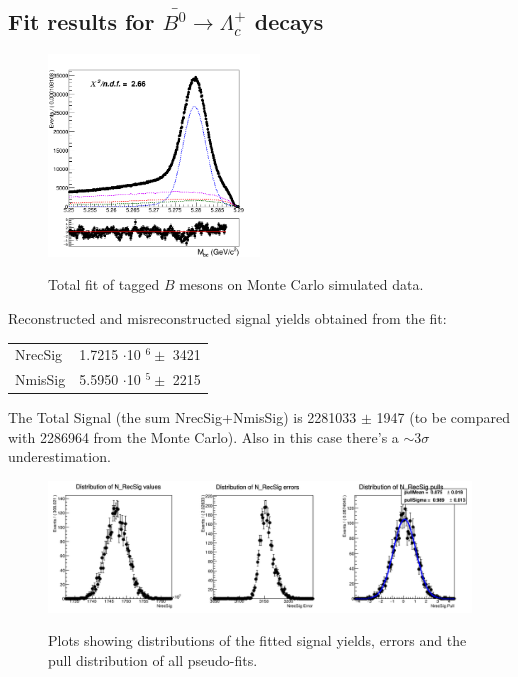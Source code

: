 \subsection{Fit results for $\bar{B^0} \rightarrow \Lambda_c^+$ decays} 

\begin{figure}[H]
    \centering
    {\includegraphics[width=0.50\textwidth]{05-BtagFit/figs/neutralCorrLambdaC_BtagFit.png}}
    \caption{Total fit of tagged $B$ mesons on Monte Carlo simulated data.}
    \label{fig:neutralCorrLambdaC_BtagFit}
    \end{figure}
    \vspace{1.5cm} 

Reconstructed and misreconstructed signal yields obtained from the fit:\\
    \vspace{0.25 cm}
    
    \begin{tabular}{ |p{2.5cm}||p{4.2cm}|  }
     \hline
     NrecSig  & 1.7215 $\cdot$10 $^6 \pm$ 3421\\
     NmisSig &  5.5950 $\cdot$10 $^5 \pm$ 2215 \\
     \hline
    \end{tabular}      
    
    \vspace{0.5 cm}
    \noindent The Total Signal (the sum  NrecSig+NmisSig) is 2281033 $\pm$ 1947 (to be compared with 2286964 from the Monte Carlo).
    Also in this case there's a $\sim 3\sigma$ underestimation. 
   
 \vspace{0.5 cm}
       
\begin{figure}[H]
\centering
{\centering\includegraphics[width=14cm]{05-BtagFit/figs/NrecSig_neutralCorrBtag_mcstudy.png}}
\caption{Plots showing distributions of the fitted signal yields, errors and the pull distribution of
all pseudo-fits. }
\label{fig:NrecSig_neutralCorrBtag_mcstudy}
\end{figure}
       

